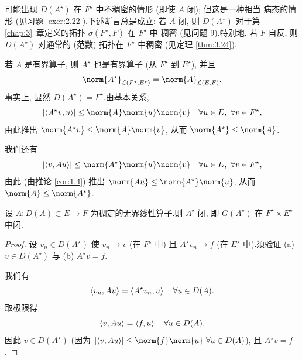 \begin{starremark}
\label{rem:2.15}
可能出现 $D(A^\star)$ 在 $F^\star$ 中不稠密的情形 (即使 $A$ 闭); 但这是一种相当
病态的情形 (见习题  \ref{exer:2.22}).下述断言总是成立: 若 $A$ 闭, 则
$D(A^\star)$ 对于第~
\ref{chap:3}~章定义的\wstar{}拓扑 $\sigma(F^\star,F)$ 在 $F^\star$ 中
稠密 (见问题 9).特别地, 若 $F$ 自反, 则 $D(A^\star)$ 对通常的 (范数) 拓扑在
$F^\star$ 中稠密 (见定理  \ref{thm:3.24}).
\end{starremark}

\begin{remark}
\label{rem:2.16}
若 $A$ 是有界算子, 则 $A^\star$ 也是有界算子 (从 $F^\star$ 到 $E^\star$), 并且
\begin{equation*}
\norm{A^\star}_{\LL(F^\star,E^\star)}=\norm{A}_{\LL(E,F)}.
\end{equation*}
事实上, 显然 $D(A^\star)=F^\star$.由基本关系,
\begin{equation*}
\abs{\dual{A^\star v}{u}}\le\norm{A}\norm{u}\norm{v}
\quad \forall u\in E,\ \forall v\in F^\star,
\end{equation*}
由此推出 $\norm{A^\star v}\le\norm{A}\norm{v}$, 从而 $\norm{A^\star}\le\norm{A}$.

我们还有
\begin{equation*}
\abs{\dual{v}{Au}}\le\norm{A^\star}\norm{u}\norm{v}
\quad \forall u\in E,\ \forall v\in F^\star,
\end{equation*}
由此 (由推论  \ref{cor:1.4}) 推出 $\norm{Au}\le\norm{A^\star}\norm{u}$, 从而
$\norm{A}\le\norm{A^\star}$.
\end{remark}

\begin{proposition}
\label{prop:2.17}
设 $A:D(A)\subset E\to F$ 为稠定的无界线性算子.则 $A^\star$ 闭, 即
$G(A^\star)$ 在 $F^\star\times E^\star$ 中闭.
\end{proposition}

\begin{proof}
设 $v_n\in D(A^\star)$ 使 $v_n\to v$ (在 $F^\star$ 中) 且 $A^\star v_n\to f$
(在 $E^\star$ 中).须验证 (a) $v\in D(A^\star)$ 与 (b) $A^\star v=f$.

我们有
\begin{equation*}
\left\langle v_n,Au\right\rangle=\left\langle A^\star v_n,u\right\rangle\quad \forall u\in D(A).
\end{equation*}
取极限得
\begin{equation*}
\left\langle v,Au\right\rangle=\left\langle f,u\right\rangle\quad \forall u\in D(A).
\end{equation*}
因此 $v\in D(A^\star)$ (因为
$\abs{\dual{v}{Au}}\le\norm{f}\norm{u}\ \forall u\in D(A)$), 且 $A^\star v=f$.
\end{proof}

